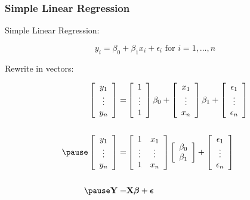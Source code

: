\documentclass[handout]{beamer}\usepackage[]{graphicx}\usepackage[]{color}
\begin{document}
\begin{frame} \frametitle{Simple Linear Regression}
Simple Linear Regression:

$$y_i = \beta_0 + \beta_1 x_i + \epsilon_i \text{  for  } i = 1,
\ldots, n$$  \pause

Rewrite in vectors:

\begin{eqnarray*}
  \left[
\begin{array}{c}  y_1 \\ \vdots \\  y_n \end{array}
  \right]   =  &
 \left[ \begin{array}{c}  1 \\ \vdots \\ 1 \end{array}  \right]   \beta_0 +
 \left[ \begin{array}{c}  x_1 \\ \vdots \\  x_n \end{array}
 \right] \beta_1 +
\left[ \begin{array}{c}  \epsilon_1 \\ \vdots \\ \epsilon_n  \end{array}
\right]
\\
 & \\ \pause
\left[
\begin{array}{c}  y_1 \\ \vdots \\  y_n \end{array}
  \right]   =  &
 \left[ \begin{array}{cc}  1 &  x_1 \\ \vdots & \vdots \\ 1 & x_n\end{array}  \right]
 \left[ \begin{array}{c}  \beta_0  \\  \beta_1 \end{array}
 \right] +
\left[ \begin{array}{c}  \epsilon_1 \\ \vdots \\ \epsilon_n  \end{array}
\right] \\
 & \\ \pause
\Y = & \X \b + \eps
\end{eqnarray*}
\end{frame}
\end{document}
